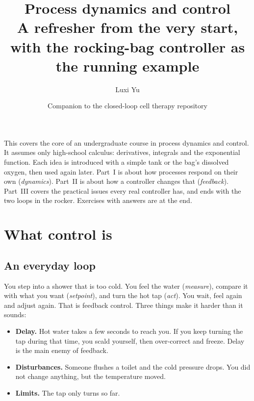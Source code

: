 \documentclass[11pt,a4paper]{article}
\title{\color{accent}\textbf{Process dynamics and control}\\[4pt]
\large A refresher from the very start, with the rocking-bag controller as the running example}
\author{Luxi Yu}
\date{Companion to the closed-loop cell therapy repository}
\begin{document}
\maketitle
\thispagestyle{fancy}

\begin{idea}[title={How to read this}]
This covers the core of an undergraduate course in process dynamics and control. It assumes only
high-school calculus: derivatives, integrals and the exponential function. Each idea is introduced with
a simple tank or the bag's dissolved oxygen, then used again later. Part~I is about how processes
respond on their own (\emph{dynamics}). Part~II is about how a controller changes that (\emph{feedback}).
Part~III covers the practical issues every real controller has, and ends with the two loops in the
rocker. Exercises with answers are at the end.
\end{idea}

\tableofcontents

\section{What control is}

\subsection{An everyday loop}
You step into a shower that is too cold. You feel the water (\emph{measure}), compare it with what you
want (\emph{setpoint}), and turn the hot tap (\emph{act}). You wait, feel again and adjust again. That is
feedback control. Three things make it harder than it sounds:
\begin{itemize}
  \item \textbf{Delay.} Hot water takes a few seconds to reach you. If you keep turning the tap during that
    time, you scald yourself, then over-correct and freeze. Delay is the main enemy of feedback.
  \item \textbf{Disturbances.} Someone flushes a toilet and the cold pressure drops. You did not change
    anything, but the temperature moved.
  \item \textbf{Limits.} The tap only turns so far.
\end{itemize}
\end{document}
